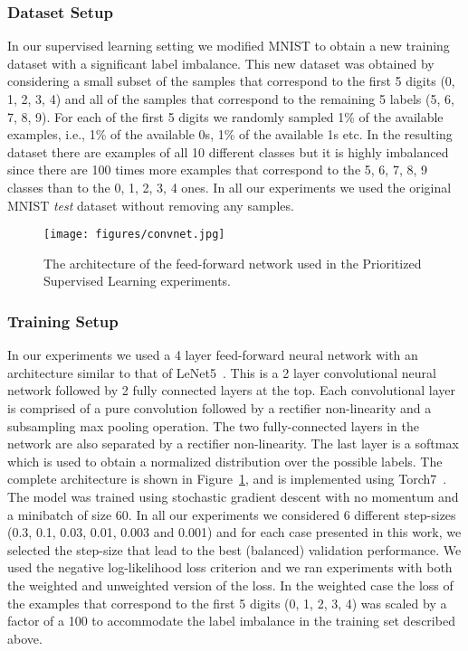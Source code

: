 \documentclass[a4paper]{article}
\begin{document}
\subsubsection{Dataset Setup}
In our supervised learning setting we modified MNIST to obtain a new training dataset with a significant label imbalance. This new dataset was obtained by considering a small subset of the samples that correspond to the first 5 digits (0, 1, 2, 3, 4) and all of the samples that correspond to the remaining 5 labels (5, 6, 7, 8, 9). For each of the first 5 digits we randomly sampled 1\% of the available examples, i.e., 1\% of the available 0s, 1\% of the available 1s etc. In the resulting dataset there are examples of all 10 different classes but it is highly imbalanced since there are 100 times more examples that correspond to the 5, 6, 7, 8, 9 classes than to the 0, 1, 2, 3, 4 ones. In all our experiments we used the original MNIST \emph{test} dataset without removing any samples. 

\begin{figure}[!h]
\centerline{
\texttt{[image: figures/convnet.jpg]}
}
\caption{
\label{convolutional-network}
}
The architecture of the feed-forward network used in the Prioritized Supervised Learning experiments.
\end{figure}

\subsubsection{Training Setup}
In our experiments we used a 4 layer feed-forward neural network with an architecture similar to that of LeNet5~\citep{lenet}. This is a 2 layer convolutional neural network followed by 2 fully connected layers at the top. Each convolutional layer is comprised of a pure convolution followed by a rectifier non-linearity and a subsampling max pooling operation. The two fully-connected layers in the network are also separated by a rectifier non-linearity. The last layer is a softmax which is used to obtain a normalized distribution over the possible labels. The complete architecture is shown in Figure~\ref{convolutional-network}, and is implemented using Torch7~\citep{torch7}.
The model was trained using stochastic gradient descent with no momentum and a minibatch of size 60. In all our experiments we considered 6 different step-sizes (0.3, 0.1, 0.03, 0.01, 0.003 and 0.001) and for each case presented in this work, we selected the step-size that lead to the best (balanced) validation performance. We used the negative log-likelihood loss criterion and we ran experiments with both the weighted and unweighted version of the loss. In the weighted case the loss of the examples that correspond to the first 5 digits (0, 1, 2, 3, 4) was scaled by a factor of a 100 to accommodate the label imbalance in the training set described above. 
\end{document}
